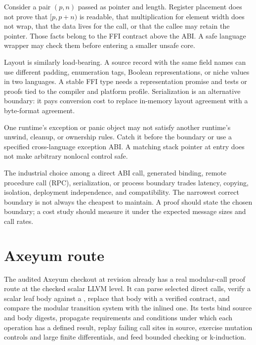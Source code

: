 Consider a pair \((p,n)\) passed as pointer and length. Register placement does
not prove that \([p,p+n)\) is readable, that multiplication for element width
does not wrap, that the data lives for the call, or that the callee may retain
the pointer. Those facts belong to the FFI contract above the ABI. A safe
language wrapper may check them before entering a smaller unsafe core.

Layout is similarly load-bearing. A source record with the same field names can
use different padding, enumeration tags, Boolean representations, or niche
values in two languages. A stable FFI type needs a representation promise and
tests or proofs tied to the compiler and platform profile. Serialization is an
alternative boundary: it pays conversion cost to replace in-memory layout
agreement with a byte-format agreement.

\begin{warning}[title={Do not unwind through an undeclared language boundary}]
One runtime's exception or panic object may not satisfy another runtime's
unwind, cleanup, or ownership rules. Catch it before the boundary or use a
specified cross-language exception ABI. A matching stack pointer at entry does
not make arbitrary nonlocal control safe.
\end{warning}

The industrial choice among a direct ABI call, generated binding, remote
procedure call (RPC),
serialization, or process boundary trades latency, copying, isolation,
deployment independence, and compatibility. The narrowest correct boundary is
not always the cheapest to maintain. A proof should state the chosen boundary;
a cost study should measure it under the expected message sizes and call rates.

\section{Axeyum route}

The audited Axeyum checkout at revision  already has a real
modular-call proof route at the checked scalar LLVM level. It can parse selected
direct calls, verify a scalar leaf body against a ,
replace that body with a verified contract, and compare the modular transition
system with the inlined one. Its tests bind source and body digests, propagate
requirements and conditions under which each operation has a defined result,
replay failing call sites in source, exercise
mutation controls and large finite differentials, and feed bounded checking or
k-induction.

